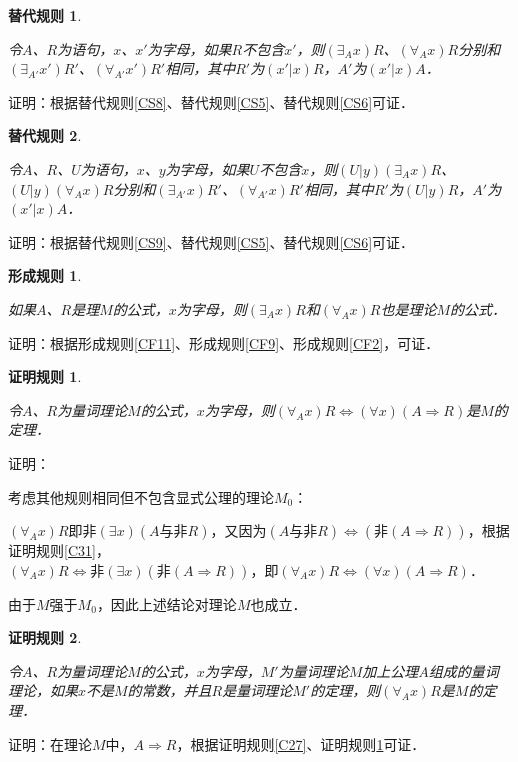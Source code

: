 \documentclass[12pt, a4paper, oneside]{book}
\newtheorem{CS}{替代规则}
\newtheorem{CF}{形成规则}
\newtheorem{C}{证明规则}
\begin{document}
			\begin{CS}\label{CS10}
				\hfill\par
				令$A$、$R$为语句，$x$、$x'$为字母，如果$R$不包含$x'$，则$(\exists_Ax)R$、$(\forall_Ax)R$分别和$(\exists_{A'}x')R'$、$(\forall_{A'}x')R'$相同，其中$R'$为$(x'|x)R$，$A'$为$(x'|x)A$．
			\end{CS}
			证明：根据替代规则\ref{CS8}、替代规则\ref{CS5}、替代规则\ref{CS6}可证．

			\begin{CS}\label{CS11}
				\hfill\par
				令$A$、$R$、$U$为语句，$x$、$y$为字母，如果$U$不包含$x$，则$(U|y)(\exists_Ax)R$、$(U|y)(\forall_Ax)R$分别和$(\exists_{A'}x)R'$、$(\forall_{A'}x)R'$相同，其中$R'$为$(U|y)R$，$A'$为$(x'|x)A$．
			\end{CS}
			证明：根据替代规则\ref{CS9}、替代规则\ref{CS5}、替代规则\ref{CS6}可证．

			\begin{CF}\label{CF12}
				\hfill\par
				如果$A$、$R$是理$M$的公式，$x$为字母，则$(\exists_Ax)R$和$(\forall_Ax)R$也是理论$M$的公式．
			\end{CF}
			证明：根据形成规则\ref{CF11}、形成规则\ref{CF9}、形成规则\ref{CF2}，可证．

			\begin{C}\label{C35}
				\hfill\par			
				令$A$、$R$为量词理论$M$的公式，$x$为字母，则$(\forall_Ax)R\Leftrightarrow (\forall x)(A\Rightarrow R)$是$M$的定理．
			\end{C}
			证明：
			\par
			考虑其他规则相同但不包含显式公理的理论$M_0$：
			\par
			$(\forall_Ax)R$即$\text{非}(\exists x)(A\text{与}\text{非}R)$，又因为$(A\text{与}\text{非}R)\Leftrightarrow (\text{非}(A\Rightarrow R))$，根据证明规则\ref{C31}，\\$(\forall_Ax)R\Leftrightarrow \text{非}(\exists x)(\text{非}(A\Rightarrow R))$，即$(\forall_Ax)R\Leftrightarrow (\forall x)(A\Rightarrow R)$．
			\par
			由于$M$强于$M_0$，因此上述结论对理论$M$也成立．

			\begin{C}\label{C36}
				\hfill\par			
				令$A$、$R$为量词理论$M$的公式，$x$为字母，$M'$为量词理论$M$加上公理$A$组成的量词理论，如果$x$不是$M$的常数，并且$R$是量词理论$M'$的定理，则$(\forall_Ax)R$是$M$的定理．
			\end{C}
			证明：在理论$M$中，$A\Rightarrow R$，根据证明规则\ref{C27}、证明规则\ref{C35}可证．
	
\end{document}
